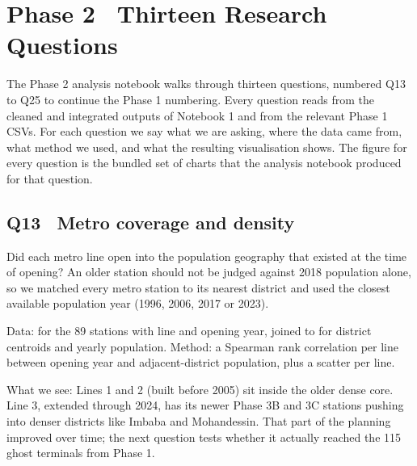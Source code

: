 
\section{Phase 2 \textbullet\ Thirteen Research Questions}
\label{sec:phase2-questions}

The Phase 2 analysis notebook walks through thirteen questions, numbered
Q13 to Q25 to continue the Phase 1 numbering. Every question reads from
the cleaned and integrated outputs of Notebook 1 and from the relevant
Phase 1 CSVs. For each question we say what we are asking, where the
data came from, what method we used, and what the resulting visualisation
shows. The figure for every question is the bundled set of charts that
the analysis notebook produced for that question.

\subsection{Q13 \textbullet\ Metro coverage and density}

Did each metro line open into the population geography that existed at
the time of opening? An older station should not be judged against
2018 population alone, so we matched every metro station to its nearest
district and used the closest available population year (1996, 2006,
2017 or 2023).

Data:  for the 89 stations with line and
opening year, joined to  for district
centroids and yearly population. Method: a Spearman rank correlation
per line between opening year and adjacent-district population, plus
a scatter per line.


What we see: Lines 1 and 2 (built before 2005) sit inside the older
dense core. Line 3, extended through 2024, has its newer Phase 3B and
3C stations pushing into denser districts like Imbaba and Mohandessin.
That part of the planning improved over time; the next question tests
whether it actually reached the 115 ghost terminals from Phase 1.

